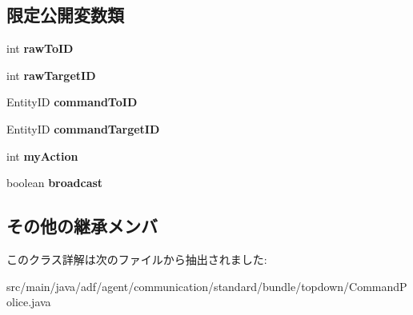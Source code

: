 \subsection*{限定公開変数類}
\begin{DoxyCompactItemize}
\item 
\hypertarget{classadf_1_1agent_1_1communication_1_1standard_1_1bundle_1_1topdown_1_1CommandPolice_aa780239e05d4eee72bba2f010e0cf37f}{}\label{classadf_1_1agent_1_1communication_1_1standard_1_1bundle_1_1topdown_1_1CommandPolice_aa780239e05d4eee72bba2f010e0cf37f} 
int {\bfseries raw\+To\+ID}
\item 
\hypertarget{classadf_1_1agent_1_1communication_1_1standard_1_1bundle_1_1topdown_1_1CommandPolice_ab4e2a31bc7ac624425ae083eb4510a3f}{}\label{classadf_1_1agent_1_1communication_1_1standard_1_1bundle_1_1topdown_1_1CommandPolice_ab4e2a31bc7ac624425ae083eb4510a3f} 
int {\bfseries raw\+Target\+ID}
\item 
\hypertarget{classadf_1_1agent_1_1communication_1_1standard_1_1bundle_1_1topdown_1_1CommandPolice_af555844ae2ce52d127f2b83304b012a0}{}\label{classadf_1_1agent_1_1communication_1_1standard_1_1bundle_1_1topdown_1_1CommandPolice_af555844ae2ce52d127f2b83304b012a0} 
Entity\+ID {\bfseries command\+To\+ID}
\item 
\hypertarget{classadf_1_1agent_1_1communication_1_1standard_1_1bundle_1_1topdown_1_1CommandPolice_a17f5e43f5dd4772899e4bd26977932a9}{}\label{classadf_1_1agent_1_1communication_1_1standard_1_1bundle_1_1topdown_1_1CommandPolice_a17f5e43f5dd4772899e4bd26977932a9} 
Entity\+ID {\bfseries command\+Target\+ID}
\item 
\hypertarget{classadf_1_1agent_1_1communication_1_1standard_1_1bundle_1_1topdown_1_1CommandPolice_a1226fb13b11a2b7164e265d76d48cabf}{}\label{classadf_1_1agent_1_1communication_1_1standard_1_1bundle_1_1topdown_1_1CommandPolice_a1226fb13b11a2b7164e265d76d48cabf} 
int {\bfseries my\+Action}
\item 
\hypertarget{classadf_1_1agent_1_1communication_1_1standard_1_1bundle_1_1topdown_1_1CommandPolice_a15e8dd86eff2eb8035edf18910d387c6}{}\label{classadf_1_1agent_1_1communication_1_1standard_1_1bundle_1_1topdown_1_1CommandPolice_a15e8dd86eff2eb8035edf18910d387c6} 
boolean {\bfseries broadcast}
\end{DoxyCompactItemize}
\subsection*{その他の継承メンバ}


このクラス詳解は次のファイルから抽出されました\+:\begin{DoxyCompactItemize}
\item 
src/main/java/adf/agent/communication/standard/bundle/topdown/Command\+Police.\+java\end{DoxyCompactItemize}
